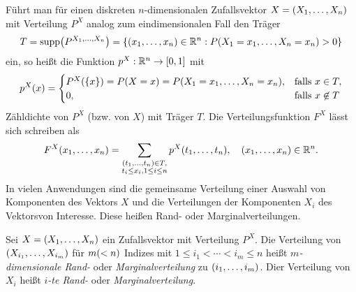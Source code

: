 \documentclass{lecture}
\begin{document}
    Führt man für einen diskreten \(n\)-dimensionalen Zufallsvektor \(X = \parentheses*{X_1, \ldots, X_n}\) mit Verteilung \(P^X\) analog zum eindimensionalen Fall den Träger
    \[
        T = \supp\parentheses*{P^{X_1, \ldots, X_n}} = \braces*{\parentheses*{x_1, \ldots, x_n} \in \R^n : P\parentheses*{X_1 = x_1, \ldots, X_n = x_n} > 0}
    \]
    ein, so heißt die Funktion \(p^X: \R^n \to \brackets*{0, 1}\) mit
    \[
        p^X\parentheses*{x} = \begin{cases}
            P^X\parentheses*{\braces*{x}} = P\parentheses*{X = x} = P\parentheses*{X_1 = x_1, \ldots, X_n = x_n}, & \text{falls }x \in T,\\
            0, & \text{falls }x \not\in T
        \end{cases}
    \]
    Zähldichte von \(P^X\) (bzw. von \(X\)) mit Träger \(T\).
    Die Verteilungsfunktion \(F^X\) lässt sich schreiben als
    \[
        F^X\parentheses*{x_1, \ldots, x_n} = \sum_{\substack{\parentheses*{t_1, \ldots, t_n} \in T,\\t_i \le x_i, 1 \le i \le n}}p^X\parentheses*{t_1, \ldots, t_n}, \quad \parentheses*{x_1, \ldots, x_n} \in \R^n.
    \]
    In vielen Anwendungen sind die gemeinsame Verteilung einer Auswahl von Komponenten des Vektors \(X\) und die Verteilungen der Komponenten \(X_i\) des Vektorsvon Interesse.
    Diese heißen Rand- oder Marginalverteilungen.

    \begin{definition}
        Sei \(X = \parentheses*{X_1, \ldots, X_n}\) ein Zufallsvektor mit Verteilung \(P^X\).
        Die Verteilung von \(\parentheses*{X_{i_1}, \ldots, X_{i_m}}\) für \(m \parentheses*{< n}\) Indizes mit \(1 \le i_1 < \cdots < i_m \le n\) heißt \emph{\(m\)-dimensionale Rand-} oder \emph{Marginalverteilung} zu \(\parentheses*{i_1, \ldots, i_m}\).
        Dier Verteilung von \(X_i\) heißt \emph{\(i\)-te Rand-} oder \emph{Marginalverteilung}.
    \end{definition}
\end{document}
